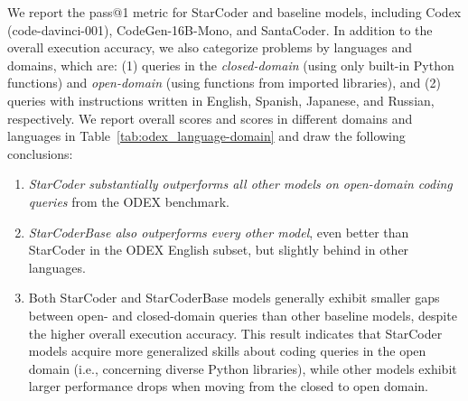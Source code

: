 \documentclass[10pt]{article} %
\begin{document}
We report the pass@1 metric for StarCoder and baseline models, including Codex (code-davinci-001), CodeGen-16B-Mono, and SantaCoder. 
In addition to the overall execution accuracy, we also categorize problems by languages and domains, which are: (1) queries in the \emph{closed-domain} (using only built-in Python functions) and \emph{open-domain} (using functions from imported libraries), and (2) queries with instructions written in English, Spanish, Japanese, and Russian, respectively. We report overall scores and scores in different domains and languages in Table~\ref{tab:odex_language-domain} and draw the following conclusions:

\begin{enumerate}

  \item \emph{StarCoder substantially outperforms all other models on open-domain coding queries} from the ODEX benchmark. 

  \item \emph{StarCoderBase also outperforms every other model}, even better than StarCoder in the ODEX English subset, but slightly behind in other languages.

  \item Both StarCoder and StarCoderBase models generally exhibit smaller gaps between open- and closed-domain queries than other baseline models, despite the higher overall execution accuracy. This result indicates that StarCoder models acquire more generalized skills about coding queries in the open domain (i.e., concerning diverse Python libraries), while other models exhibit larger performance drops when moving from the closed to open domain.
\end{enumerate}
\end{document}
